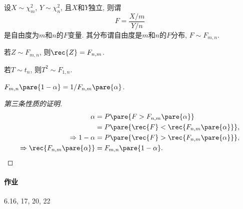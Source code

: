 \documentclass[../Statistics.tex]{subfiles}
\begin{document}
设$X\sim \chi_m^2$, $Y\sim \chi_n^2$, 且$X$和$Y$独立, 则谓
\[ F = \frac{X/m}{Y/n} \]
是自由度为$m$和$n$的$F$变量. 其分布谓自由度是$m$和$n$的$F$分布, $F\sim F_{m,n}$.

\begin{corollary}[$F$-分布的性质]
    \mbox{}
    \begin{cenum}
        \item 若$Z\sim F_{m,n}$, 则$\rec{Z} = F_{n,m}$.
        \item 若$T\sim t_n$, 则$T^2 \sim F_{1,n}$.
        \item $F_{m,n}\pare{1-\alpha} = 1/F_{n,m}\pare{\alpha}$.
    \end{cenum}
\end{corollary}
\begin{proof}[第三条性质的证明]
    \begin{align*}
         \alpha &= P\pare{F>F_{n,m}\pare{\alpha}} \\
         &= P\pare{\rec{F} < \rec{F_{n,m}\pare{\alpha}}}, \\
         \Rightarrow 1-\alpha &= P\pare{\rec{F} > \rec{F_{n,m}\pare{\alpha}}}, \\
         \Rightarrow \rec{F_{n,m}\pare{\alpha}} &= F_{m,n}\pare{1-\alpha}. \qedhere
    \end{align*} 
\end{proof}


\paragraph{作业} %
\label{par:作业}

6.16, 17, 20, 22




\end{document}
